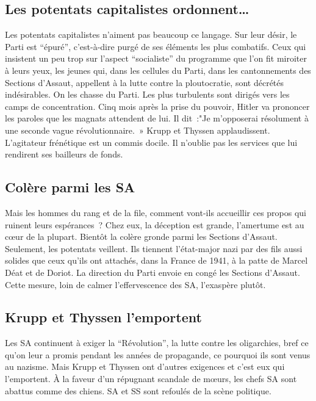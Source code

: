 \documentclass[french,twoside]{book} %
\begin{document}
\subsection[Les potentats capitalistes ordonnent…]{Les potentats capitalistes ordonnent…}
\noindent Les potentats capitalistes n’aiment pas beaucoup ce langage. Sur leur désir, le Parti est “épuré”, c’est-à-dire purgé de ses éléments les plus combatifs. Ceux qui insistent un peu trop sur l’aspect “socialiste” du programme que l’on fit miroiter à leurs yeux, les jeunes qui, dans les cellules du Parti, dans les cantonnements des Sections d’Assaut, appellent à la lutte contre la ploutocratie, sont décrétés indésirables. On les chasse du Parti. Les plus turbulents sont dirigés vers les camps de concentration. Cinq mois après la prise du pouvoir, Hitler va prononcer les paroles que les magnats attendent de lui. Il dit :"Je m’opposerai résolument à une seconde vague révolutionnaire. » Krupp et Thyssen applaudissent. L’agitateur frénétique est un commis docile. Il n’oublie pas les services que lui rendirent ses bailleurs de fonds.
\subsection[Colère parmi les SA]{Colère parmi les SA}
\noindent Mais les hommes du rang et de la file, comment vont-ils accueillir ces propos qui ruinent leurs espérances ? Chez eux, la déception est grande, l’amertume est au cœur de la plupart. Bientôt la colère gronde parmi les Sections d’Assaut. Seulement, les potentats veillent. Ils tiennent l’état-major nazi par des fils aussi solides que ceux qu’ils ont attachés, dans la France de 1941, à la patte de Marcel Déat et de Doriot. La direction du Parti envoie en congé les Sections d’Assaut. Cette mesure, loin de calmer l’effervescence des SA, l’exaspère plutôt.
\subsection[Krupp et Thyssen l’emportent]{Krupp et Thyssen l’emportent}
\noindent Les SA continuent à exiger la “Révolution”, la lutte contre les oligarchies, bref ce qu’on leur a promis pendant les années de propagande, ce pourquoi ils sont venus au nazisme. Mais Krupp et Thyssen ont d’autres exigences et c’est eux qui l’emportent. À la faveur d’un répugnant scandale de mœurs, les chefs SA sont abattus comme des chiens. SA et SS sont refoulés de la scène politique.
\end{document}
